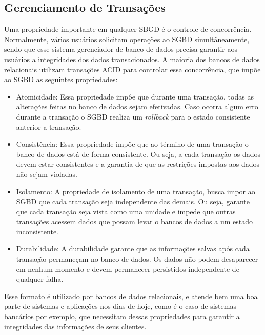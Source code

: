 \subsection{Gerenciamento de Transações} \label{manage_transaction}
	Uma propriedade importante em qualquer SBGD é o controle de concorrência. Normalmente, vários usuários solicitam operações ao SGBD simultâneamente, sendo que esse sistema gerenciador de banco de dados precisa garantir aos usuários a integridades dos dados transacionados. A maioria dos bancos de dados relacionais utilizam transações ACID\cite{SistemaDeBd} para controlar essa concorrência, que impõe ao SGBD as seguintes propriedades:
	\begin{itemize}
		\item Atomicidade: Essa propriedade impôe que durante uma transação, todas as alterações feitas no banco de dados sejam efetivadas. Caso ocorra algum erro durante a transação o SGBD realiza um \textit{rollback} para o estado consistente anterior a transação.
		\item Consistência: Essa propriedade impôe que ao término de uma transação o banco de dados está de forma consistente. Ou seja, a cada transação os dados devem estar consistentes e a garantia de que as restrições impostas aos dados não sejam violadas.
		\item Isolamento: A propriedade de isolamento de uma transação, busca impor ao SGBD que cada transação seja independente das demais. Ou seja, garante que cada transação seja vista como uma unidade e impede que outras transações acessem dados que possam levar o bancos de dados a um estado inconsistente. 
		\item Durabilidade: A durabilidade garante que as informações salvas após cada transação permaneçam no banco de dados. Os dados não podem desaparecer em nenhum momento e devem permanecer persistidos independente de qualquer falha.
	\end{itemize}
	
	Esse formato é utilizado por bancos de dados relacionais, e atende bem uma boa parte de sistemas e aplicações nos dias de hoje, como é o caso de sistemas bancários por exemplo, que necessitam dessas propriedades para garantir a integridades das informações de seus clientes.
	
